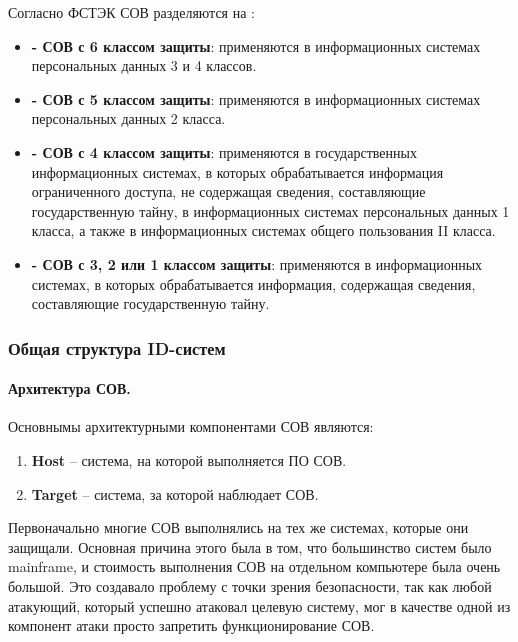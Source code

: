 Согласно ФСТЭК СОВ разделяются на \cite{IDSFSTEK}:
\begin{itemize}
	\item \textbf{- СОВ с 6 классом защиты}: применяются в информационных системах
	персональных данных 3 и 4 классов.

	\item \textbf{- СОВ с 5 классом защиты}: применяются в информационных системах
	персональных данных 2 класса.

	\item \textbf{- СОВ с 4 классом защиты}: применяются в государственных информационных
	системах, в которых обрабатывается информация ограниченного доступа, не содержащая
	сведения, составляющие государственную тайну, в информационных системах персональных
	данных 1 класса, а также в информационных системах общего пользования II класса.

	\item \textbf{- СОВ с 3, 2 или 1 классом защиты}: применяются в информационных системах,
	в которых обрабатывается информация, содержащая сведения, составляющие государственную
	тайну.
\end{itemize}



\subsubsection{Общая структура ID-систем}


\paragraph*{Архитектура СОВ.} Основнымы архитектурными компонентами СОВ являются:

\begin{enumerate}
	\item \textbf{Host} -- система, на которой выполняется ПО СОВ.

	\item \textbf{Target} -- система, за которой наблюдает СОВ.
\end{enumerate}

Первоначально многие СОВ выполнялись на тех же системах, которые они защищали.
Основная причина этого была в том, что большинство систем было mainframe, и стоимость
выполнения СОВ на отдельном компьютере была очень большой. Это создавало проблему с
точки зрения безопасности, так как любой атакующий, который успешно атаковал целевую
систему, мог в качестве одной из компонент атаки просто запретить функционирование СОВ.

